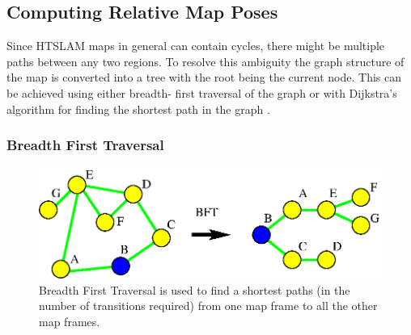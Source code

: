 



\subsection{Computing Relative Map Poses}
\label{sec:relative_poses}

Since HTSLAM maps in general can contain cycles, there might be
multiple paths between any two regions. To resolve this ambiguity the
graph structure of the map is converted into a tree with the root
being the current node. This can be achieved using either breadth-
first traversal of the graph or with Dijkstra's algorithm for finding
the shortest path in the graph \cite{dijkstra_shortest_path}.

\subsubsection{Breadth First Traversal}

\begin{figure}
\begin{center}
\includegraphics[width=12cm]{Pics/fig_bft}
\end{center}
\caption[Breadth First Traversal]
{Breadth First Traversal is used to find a shortest paths (in
the number of transitions required) from one map frame to all the
other map frames.}
\label{fig:bst}
\end{figure}

